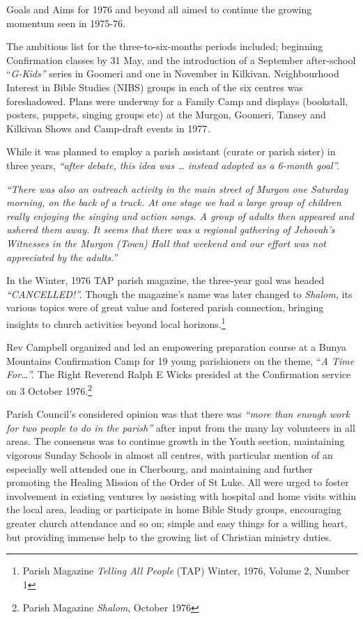 Goals and Aims for 1976 and beyond all aimed to continue the growing momentum seen in 1975-76.



The ambitious list for the three-to-six-months periods included; beginning Confirmation classes by 31 May, and the introduction of a September after-school ``\emph{G-Kids''} series in Goomeri and one in November in Kilkivan. Neighbourhood Interest in Bible Studies (NIBS) groups in each of the six centres was foreshadowed. Plans were underway for a Family Camp and displays (bookstall, posters, puppets, singing groups etc) at the Murgon, Goomeri, Tansey and Kilkivan Shows and Camp-draft events in 1977\emph{.}



While it was planned to employ a parish assistant (curate or parish sister) in three years, \emph{``after debate, this idea was \ldots{} instead adopted as a 6-month goal''.}



\emph{``There was also an outreach activity in the main street of Murgon one Saturday morning, on the back of a truck. At one stage we had a large group of children really enjoying the singing and action songs. A group of adults then appeared and ushered them away. It seems that there was a regional gathering of Jehovah's Witnesses in the Murgon (Town) Hall that weekend and our effort was not appreciated by the adults.''}



In the Winter, 1976 TAP parish magazine, the three-year goal was headed \emph{``CANCELLED!''.} Though the magazine's name was later changed to \emph{Shalom,} its various topics were of great value and fostered parish connection, bringing insights to church activities beyond local horizons.\footnote{Parish Magazine \emph{Telling All People} (TAP) Winter, 1976, Volume 2, Number 1}


Rev Campbell organized and led an empowering preparation course at a Bunya Mountains Confirmation Camp for 19 young parishioners on the theme, ``\emph{A Time For\ldots''.} The Right Reverend Ralph E Wicks presided at the Confirmation service on 3 October 1976.\footnote{Parish Magazine \emph{Shalom}, October 1976}


Parish Council's considered opinion was that there was \emph{``more than enough work for two people to do in the parish''} after input from the many lay volunteers in all areas. The consensus was to continue growth in the Youth section, maintaining vigorous Sunday Schools in almost all centres, with particular mention of an especially well attended one in Cherbourg, and maintaining and further promoting the Healing Mission of the Order of St Luke. All were urged to foster involvement in existing ventures by assisting with hospital and home visits within the local area, leading or participate in home Bible Study groups, encouraging greater church attendance and so on; simple and easy things for a willing heart, but providing immense help to the growing list of Christian ministry duties.



